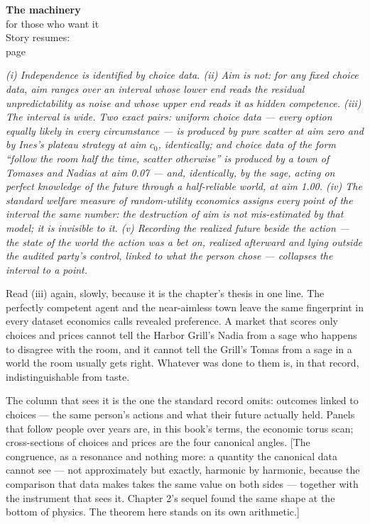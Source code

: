 \begin{machinery}{\textbf{The machinery}\\for those who want it\\[3pt]{\color{muted}Story resumes:\\page~\pageref{ch14}}}
\label{claim-28}

\noindent \emph{(i) Independence is identified by
choice data. (ii) Aim is not: for any fixed choice data, aim ranges
over an interval whose lower end reads the residual unpredictability
as noise and whose upper end reads it as hidden competence. (iii) The
interval is wide. Two exact pairs: uniform choice data --- every option
equally likely in every circumstance --- is produced by pure scatter at
aim zero and by Ines's plateau strategy at aim \(c_0\), identically; and
choice data of the form ``follow the room half the time, scatter
otherwise'' is produced by a town of Tomases and Nadias at aim 0.07 ---
and, identically, by the sage, acting on perfect knowledge of the
future through a half-reliable world, at aim 1.00. (iv) The standard
welfare measure of random-utility economics assigns every point of the
interval the same number: the destruction of aim is not mis-estimated
by that model; it is invisible to it. (v) Recording the realized future
beside the action --- the state of the world the action was a bet on,
realized afterward and lying outside the audited party's control,
linked to what the person chose --- collapses the interval to a point.}

Read (iii) again, slowly, because it is the chapter's thesis in one
line. The perfectly competent agent and the near-aimless town leave
the same fingerprint in every dataset economics calls revealed
preference. A market that scores only choices and prices cannot tell
the Harbor Grill's Nadia from a sage who happens to disagree with the
room, and it cannot tell the Grill's Tomas from a sage in a world the
room usually gets right. Whatever was done to them is, in that record,
indistinguishable from taste.

The column that sees it is the one the standard record omits: outcomes
linked to choices --- the same person's actions and what their future
actually held. Panels that follow people over years are, in this
book's terms, the economic torus scan; cross-sections of choices and
prices are the four canonical angles. {[}The congruence, as a resonance
and nothing more: a quantity the canonical data cannot see --- not
approximately but exactly, harmonic by harmonic, because the
comparison that data makes takes the same value on both sides ---
together with the instrument that sees it. Chapter 2's sequel found the same shape at
the bottom of physics. The theorem here stands on its own arithmetic.{]}

\end{machinery}

